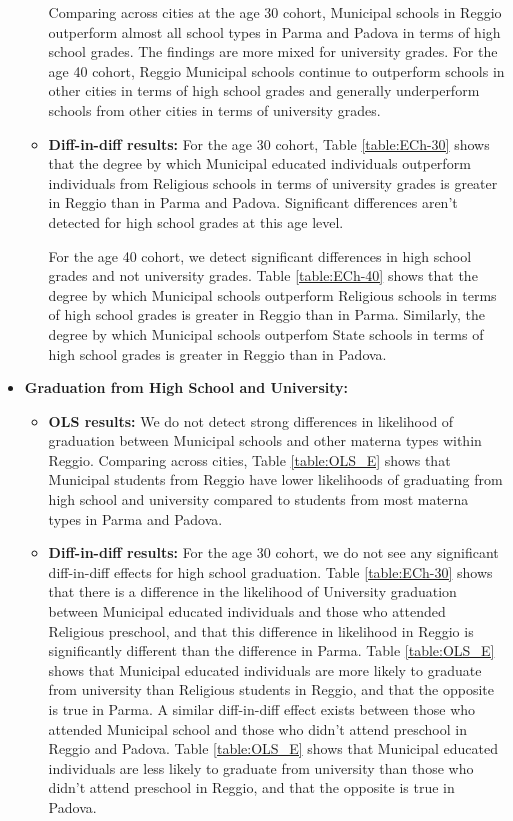 \documentclass[11pt]{article}
\begin{document}
\begin{itemize}
\begin{itemize}
Comparing across cities at the age 30 cohort, Municipal schools in Reggio outperform almost all school types in Parma and Padova in terms of high school grades. The findings are more mixed for university grades. For the age 40 cohort, Reggio Municipal schools continue to outperform schools in other cities in terms of high school grades and generally underperform schools from other cities in terms of university grades.
		
	\item \textbf{Diff-in-diff results:} For the age 30 cohort, Table \ref{table:ECh-30} shows that the degree by which Municipal educated individuals outperform individuals from Religious schools in terms of university grades is greater in Reggio than in Parma and Padova. Significant differences aren't detected for high school grades at this age level.
	
	For the age 40 cohort, we detect significant differences in high school grades and not university grades. Table \ref{table:ECh-40} shows that the degree by which Municipal schools outperform Religious schools in terms of high school grades is greater in Reggio than in Parma. Similarly, the degree by which Municipal schools outperfom State schools in terms of high school grades is greater in Reggio than in Padova.
\end{itemize}

\item \textbf{Graduation from High School and University:} 
	\begin{itemize}
	\item \textbf{OLS results:} We do not detect strong differences in likelihood of graduation between Municipal schools and other materna types within Reggio. Comparing across cities, Table \ref{table:OLS_E} shows that Municipal students from Reggio have lower likelihoods of graduating from high school and university compared to students from most materna types in Parma and Padova.
	\item \textbf{Diff-in-diff results:} For the age 30 cohort, we do not see any significant diff-in-diff effects for high school graduation. Table \ref{table:ECh-30} shows that there is a difference in the likelihood of University graduation between Municipal educated individuals and those who  attended Religious preschool, and that this difference in likelihood in Reggio is significantly different than the difference in Parma. Table \ref{table:OLS_E} shows that Municipal educated individuals are more likely to graduate from university than Religious students in Reggio, and that the opposite is true in Parma. A similar diff-in-diff effect exists between those who attended Municipal school and those who didn't attend preschool in Reggio and Padova. Table \ref{table:OLS_E} shows that Municipal educated individuals are less likely to graduate from university than those who didn't attend preschool in Reggio, and that the opposite is true in Padova.
	

\end{itemize}
\end{itemize}
\end{document}
